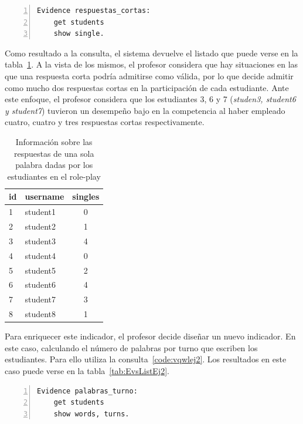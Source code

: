 \begin{lstlisting}[caption=Respuestas de una sola palabra, label=code:vqwlej1,numbers=left, captionpos=b, morekeywords={Evidence,get, students, single, show, words, sentences, turns, time, points}]
Evidence respuestas_cortas:
    get students
    show single.
\end{lstlisting}

Como resultado a la consulta, el sistema devuelve el listado que puede verse en la tabla~\ref{tab:EvsListEj1}. A la vista de los mismos, el profesor considera que hay situaciones en las que una respuesta corta podría admitirse como válida, por lo que decide admitir como mucho dos respuestas cortas en la participación de cada estudiante. Ante este enfoque, el profesor considera que los estudiantes 3, 6 y 7 (\emph{studen3, student6 y student7}) tuvieron un desempeño bajo en la competencia al haber empleado cuatro, cuatro y tres respuestas cortas respectivamente.

\begin{table}
	\centering
	\caption{Información sobre las respuestas de una sola palabra dadas por los estudiantes en el role-play}
	\label{tab:EvsListEj1}
	\begin{tabular}{|l|l|c|}
		\hline
		id & username & singles \\
		\hline
		\hline
		1 & student1 & 0  \\
		\hline
		2 & student2 & 1  \\
		\hline
		3 & student3 & 4  \\
		\hline
		4 & student4 & 0  \\
		\hline
		5 & student5 & 2  \\
		\hline
		6 & student6 & 4  \\
		\hline
		7 & student7 & 3  \\
		\hline
		8 & student8 & 1  \\
		\hline
	\end{tabular}
\end{table}

Para enriquecer este indicador, el profesor decide diseñar un nuevo indicador. En este caso, calculando el número de palabras por turno que escriben los estudiantes. Para ello utiliza la consulta~\ref{code:vqwlej2}. Los resultados en este caso puede verse en la tabla~\ref{tab:EvsListEj2}.

\begin{lstlisting}[caption=Respuestas de una sola palabra, label=code:vqwlej2,numbers=left, captionpos=b, morekeywords={Evidence,get, students, single, show, words, sentences, turns, time, points}]
Evidence palabras_turno:
    get students
    show words, turns.
\end{lstlisting}

